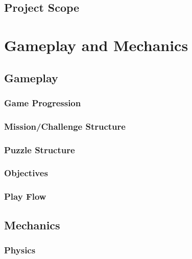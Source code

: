 \documentclass[12pt,titlepage]{article}
\begin{document}
\subsection{Project Scope}
%

\newpage
\section{Gameplay and Mechanics}

\subsection{Gameplay}

\subsubsection{Game Progression}

\subsubsection{Mission/Challenge Structure}

\subsubsection{Puzzle Structure}

\subsubsection{Objectives}

\subsubsection{Play Flow}

\subsection{Mechanics}

\subsubsection{Physics}
\end{document}
